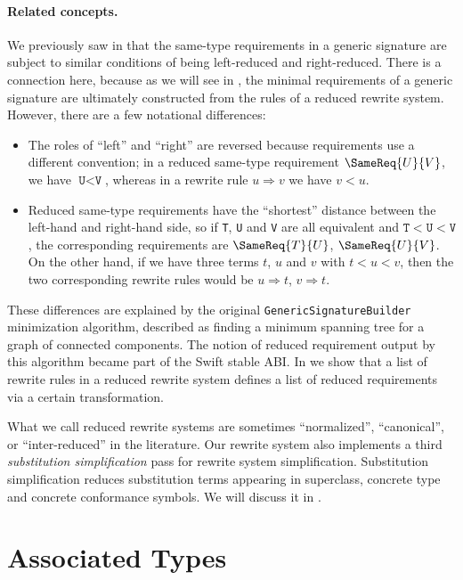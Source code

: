 \documentclass[../generics]{subfiles}
\begin{document}
\paragraph{Related concepts.}
We previously saw in  that the same-type requirements in a generic signature are subject to similar conditions of being left-reduced and right-reduced. There is a connection here, because as we will see in , the minimal requirements of a generic signature are ultimately constructed from the rules of a reduced rewrite system. However, there are a few notational differences:
\begin{itemize}
\item The roles of ``left'' and ``right'' are reversed because requirements use a different convention; in a reduced same-type requirement $\SameReq{U}{V}$, we have $\texttt{U} < \texttt{V}$, whereas in a rewrite rule $u\Rightarrow v$ we have $v<u$.
\item Reduced same-type requirements have the ``shortest'' distance between the left-hand and right-hand side, so if \texttt{T}, \texttt{U} and \texttt{V} are all equivalent and $\texttt{T}<\texttt{U}<\texttt{V}$, the corresponding requirements are $\SameReq{T}{U}$, $\SameReq{U}{V}$. On the other hand, if we have three terms $t$, $u$ and $v$ with $t<u<v$, then the two corresponding rewrite rules would be $u\Rightarrow t$, $v\Rightarrow t$.
\end{itemize}
These differences are explained by the original \texttt{GenericSignatureBuilder} minimization algorithm, described as finding a minimum spanning tree for a graph of connected components. The notion of reduced requirement output by this algorithm became part of the Swift stable ABI. In  we show that a list of rewrite rules in a reduced rewrite system defines a list of reduced requirements via a certain transformation.
 
What we call reduced rewrite systems are sometimes ``normalized'', ``canonical'', or ``inter-reduced'' in the literature. Our rewrite system also implements a third \emph{substitution simplification} pass for rewrite system simplification. Substitution simplification reduces substitution terms appearing in superclass, concrete type and concrete conformance symbols. We will discuss it in .

\section{Associated Types}\label{critical pairs}
\end{document}
